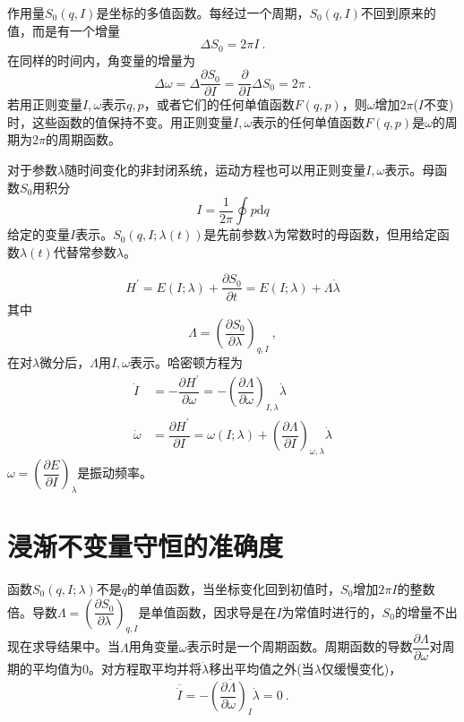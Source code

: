 \documentclass[11pt,a4paper]{article}
\newcommand{\dif}{\mathrm{d}}
\begin{document}
作用量$S_0(q, I)$是坐标的多值函数。每经过一个周期，$S_0(q, I)$不回到原来的值，而是有一个增量
\begin{equation}
\Delta S_0 = 2\pi I ~.
\end{equation}
在同样的时间内，角变量的增量为
\begin{equation}
\Delta \omega = \Delta \dfrac{\partial S_0}{\partial I} = \dfrac{\partial}{\partial I}  \Delta S_0 = 2\pi ~.
\end{equation}
若用正则变量$I, \omega$表示$q, p$，或者它们的任何单值函数$F(q, p)$，则$\omega$增加$2\pi$($I$不变)时，这些函数的值保持不变。用正则变量$I, \omega $表示的任何单值函数$F(q, p)$是$\omega$的周期为$2\pi$的周期函数。


对于参数$\lambda$随时间变化的非封闭系统，运动方程也可以用正则变量$I, \omega$表示。母函数$S_0$用积分
\begin{equation}
I = \frac{1}{2\pi} \oint p \dif q
\end{equation}
给定的变量$I$表示。$S_0(q, I; \lambda(t))$是先前参数$\lambda$为常数时的母函数，但用给定函数$\lambda(t)$代替常参数$\lambda$。

\begin{equation}
H^\prime = E(I; \lambda) +\dfrac{\partial S_0}{\partial t}  = E(I; \lambda) +\Lambda \dot \lambda
\end{equation}
其中
\begin{equation}
\Lambda = \left(\dfrac{\partial S_0}{\partial \lambda} \right)_{q, I} ~,
\end{equation}
在对$\lambda$微分后，$\Lambda$用$I, \omega$表示。哈密顿方程为
\begin{align}
 \dot I &= -\dfrac{\partial H^\prime}{\partial \omega}  = -\left(\dfrac{\partial \Lambda}{\partial \omega} \right)_{I, \lambda} \dot \lambda \\
 \dot \omega &= \dfrac{\partial H^\prime}{\partial I}  = \omega(I; \lambda) +\left(\dfrac{\partial \Lambda}{\partial I} \right)_{\omega, \lambda} \dot \lambda
\end{align}
$\omega = \left(\dfrac{\partial E}{\partial I} \right)_\lambda$是振动频率。

\section{浸渐不变量守恒的准确度}
函数$S_0(q, I; \lambda)$不是$q$的单值函数，当坐标变化回到初值时，$S_0$增加$2\pi I$的整数倍。导数$\Lambda = \left(\dfrac{\partial S_0}{\partial \lambda} \right)_{q, I}$是单值函数，因求导是在$I$为常值时进行的，$S_0$的增量不出现在求导结果中。当$\Lambda$用角变量$\omega$表示时是一个周期函数。周期函数的导数$\dfrac{\partial \Lambda}{\partial \omega}$对周期的平均值为$0$。对方程取平均并将$\dot \lambda$移出平均值之外(当$\lambda$仅缓慢变化)，
\begin{equation}
\overline{\dot I} = -\overline{\left(\dfrac{\partial \Lambda}{\partial \omega} \right)_I} \dot \lambda = 0 ~.
\end{equation}
\end{document}
